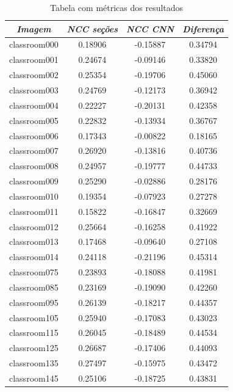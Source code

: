 \documentclass[cic,tc]{iiufrgs}
\begin{document}
\begin{table}[h]
    \caption{Tabela com métricas dos resultados}
    \centering
        \begin{tabular}{c|c|c|c}
          \hline
          \textit{Imagem} & \textit{NCC seções} & \textit{NCC CNN} & \textit{Diferença} \\
          \hline
          \hline
          classroom000 & 0.18906 & -0.15887 & 0.34794 \\
          classroom001 & 0.24674 & -0.09146 & 0.33820 \\
          classroom002 & 0.25354 & -0.19706 & 0.45060 \\
          classroom003 & 0.24769 & -0.12173 & 0.36942 \\
          classroom004 & 0.22227 & -0.20131 & 0.42358 \\
          classroom005 & 0.22832 & -0.13934 & 0.36767 \\
          classroom006 & 0.17343 & -0.00822 & 0.18165 \\
          classroom007 & 0.26920 & -0.13816 & 0.40736 \\
          classroom008 & 0.24957 & -0.19777 & 0.44733 \\
          classroom009 & 0.25290 & -0.02886 & 0.28176 \\
          classroom010 & 0.19354 & -0.07923 & 0.27278 \\
          classroom011 & 0.15822 & -0.16847 & 0.32669 \\
          classroom012 & 0.25664 & -0.16258 & 0.41922 \\
          classroom013 & 0.17468 & -0.09640 & 0.27108 \\
          classroom014 & 0.24118 & -0.21196 & 0.45314 \\
          classroom075 & 0.23893 & -0.18088 & 0.41981 \\
          classroom085 & 0.23169 & -0.19090 & 0.42260 \\
          classroom095 & 0.26139 & -0.18217 & 0.44357 \\
          classroom105 & 0.25940 & -0.17083 & 0.43023 \\
          classroom115 & 0.26045 & -0.18489 & 0.44534 \\
          classroom125 & 0.26687 & -0.17406 & 0.44093 \\
          classroom135 & 0.27497 & -0.15975 & 0.43472 \\
          classroom145 & 0.25106 & -0.18725 & 0.43831 \\

\end{tabular}
\end{table}
\end{document}
